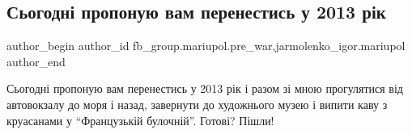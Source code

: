  
 
 
 
 

\subsection{Сьогодні пропоную вам перенестись у 2013 рік}
\label{sec:30_01_2023.fb.fb_group.mariupol.pre_war.1.sogodn__proponuyu_va}
 
\ifcmt
 author_begin
   author_id fb_group.mariupol.pre_war,jarmolenko_igor.mariupol
 author_end
\fi

Сьогодні пропоную вам перенестись у 2013 рік і разом зі мною прогулятися від
автовокзалу до моря і назад, завернути до художнього музею і випити каву з
круасанами у \enquote{Французькій булочній}. Готові? Пішли!

